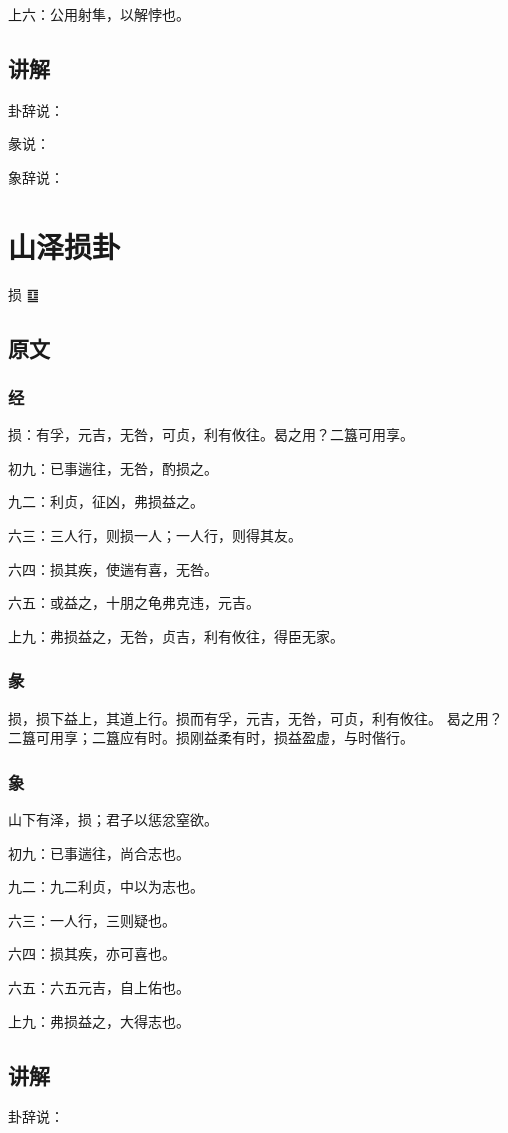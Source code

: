 \documentclass[12pt,oneside]{book}
\begin{document}
上六：公用射隼，以解悖也。

\section{讲解}
卦辞说：

彖说：

象辞说：

\chapter{山泽损卦}
损 {\Large ䷨}
\section{原文}

\subsection{经}
损：有孚，元吉，无咎，可贞，利有攸往。曷之用？二簋可用享。

初九：已事遄往，无咎，酌损之。

九二：利贞，征凶，弗损益之。

六三：三人行，则损一人；一人行，则得其友。

六四：损其疾，使遄有喜，无咎。

六五：或益之，十朋之龟弗克违，元吉。

上九：弗损益之，无咎，贞吉，利有攸往，得臣无家。

\subsection{彖}
损，损下益上，其道上行。损而有孚，元吉，无咎，可贞，利有攸往。 曷之用？ 二簋可用享；二簋应有时。损刚益柔有时，损益盈虚，与时偕行。

\subsection{象}
山下有泽，损；君子以惩忿窒欲。

初九：已事遄往，尚合志也。

九二：九二利贞，中以为志也。

六三：一人行，三则疑也。

六四：损其疾，亦可喜也。

六五：六五元吉，自上佑也。

上九：弗损益之，大得志也。

\section{讲解}
卦辞说：
\end{document}
